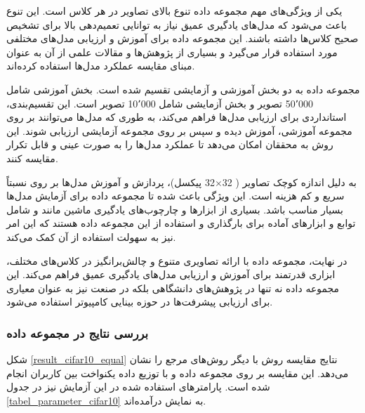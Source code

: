 یکی از ویژگی‌های مهم مجموعه داده
تنوع بالای تصاویر در هر کلاس است. این تنوع باعث می‌شود که مدل‌های یادگیری عمیق نیاز به توانایی تعمیم‌دهی بالا برای تشخیص صحیح کلاس‌ها داشته باشند. این مجموعه داده برای آموزش و ارزیابی مدل‌های مختلفی مورد استفاده قرار می‌گیرد و بسیاری از پژوهش‌ها و مقالات علمی از آن به عنوان مبنای مقایسه عملکرد مدل‌ها استفاده کرده‌اند.

مجموعه داده
به دو بخش آموزشی و آزمایشی تقسیم شده است. بخش آموزشی شامل 50٬000 تصویر و بخش آزمایشی شامل 10٬000 تصویر است. این تقسیم‌بندی، استانداردی برای ارزیابی مدل‌ها فراهم می‌کند، به طوری که مدل‌ها می‌توانند بر روی مجموعه آموزشی، آموزش دیده و سپس بر روی مجموعه آزمایشی ارزیابی شوند. این روش به محققان امکان می‌دهد تا عملکرد مدل‌ها را به صورت عینی و قابل تکرار مقایسه کنند.

به دلیل اندازه کوچک تصاویر (%
32$\times$32
پیکسل)، پردازش و آموزش مدل‌ها بر روی
نسبتاً سریع و کم هزینه است. این ویژگی باعث شده تا مجموعه داده 
برای آزمایش مدل‌ها بسیار مناسب باشد. بسیاری از ابزارها و چارچوب‌های%
یادگیری ماشین مانند
و
شامل توابع و ابزارهای آماده برای بارگذاری و استفاده از این مجموعه داده هستند که این امر نیز به سهولت استفاده از آن کمک می‌کند.

در نهایت، مجموعه داده
با ارائه تصاویری متنوع و چالش‌برانگیز در کلاس‌های مختلف، ابزاری قدرتمند برای آموزش و ارزیابی مدل‌های یادگیری عمیق فراهم می‌کند. این مجموعه داده نه تنها در پژوهش‌های دانشگاهی بلکه در صنعت نیز به عنوان معیاری برای ارزیابی پیشرفت‌ها در حوزه بینایی کامپیوتر استفاده می‌شود.


\vspace{3mm}
\subsubsection{
	بررسی نتایج در مجموعه داده
}\vspace{-1mm}


شکل
\ref{result_cifar10_equal}
نتایج مقایسه روش
با دیگر روش‌های مرجع را نشان می‌دهد. این مقایسه بر روی مجموعه داده
و با توزیع داده یکنواخت بین کاربران انجام شده است. پارامترهای استفاده شده در این آزمایش نیز در جدول
\ref{tabel_parameter_cifar10}
به نمایش درآمده‌اند.


